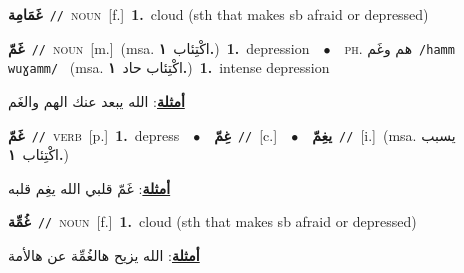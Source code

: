 \documentclass[10pt,a4paper,twoside]{article} %
\begin{document}
\begin{multicols}{2}
{\setlength\topsep{0pt}\textbf{\foreignlanguage{arabic}{غَمَامِة}}\ {\color{gray}\texttt{//}\color{black}}\ \textsc{noun}\ [f.]\ \textbf{1.}~cloud (sth that makes sb afraid or depressed)\ } \vspace{2mm}

{\setlength\topsep{0pt}\textbf{\foreignlanguage{arabic}{غَمّ}}\ {\color{gray}\texttt{//}\color{black}}\ \textsc{noun}\ [m.]\ \color{gray}(msa. \foreignlanguage{arabic}{اكْتِئاب}~\foreignlanguage{arabic}{\textbf{١.}})\color{black}\ \textbf{1.}~depression\ \ $\bullet$\ \ \textsc{ph.} \color{gray} \foreignlanguage{arabic}{هم وغَم}\color{black}\ {\color{gray}\texttt{/{\sffamily hamm wuɣamm}/}\color{black}}\ \color{gray} (msa. \foreignlanguage{arabic}{اكْتِئاب حاد}~\foreignlanguage{arabic}{\textbf{١.}})\color{black}\ \textbf{1.}~intense depression\  \begin{flushright}\color{gray}\foreignlanguage{arabic}{\textbf{\underline{\foreignlanguage{arabic}{أمثلة}}}: الله يبعد عنك الهم والغَم}\end{flushright}\color{black}} \vspace{2mm}

{\setlength\topsep{0pt}\textbf{\foreignlanguage{arabic}{غَمّ}}\ {\color{gray}\texttt{//}\color{black}}\ \textsc{verb}\ [p.]\ \textbf{1.}~depress\ \ $\bullet$\ \ \setlength\topsep{0pt}\textbf{\foreignlanguage{arabic}{غِمّ}}\ {\color{gray}\texttt{//}\color{black}}\ [c.]\ \ $\bullet$\ \ \setlength\topsep{0pt}\textbf{\foreignlanguage{arabic}{يغِمّ}}\ {\color{gray}\texttt{//}\color{black}}\ [i.]\ \color{gray}(msa. \foreignlanguage{arabic}{يسبب اكْتِئاب}~\foreignlanguage{arabic}{\textbf{١.}})\color{black}\  \begin{flushright}\color{gray}\foreignlanguage{arabic}{\textbf{\underline{\foreignlanguage{arabic}{أمثلة}}}: غَمّ قلبي الله يغِم قلبه}\end{flushright}\color{black}} \vspace{2mm}

{\setlength\topsep{0pt}\textbf{\foreignlanguage{arabic}{غُمِّة}}\ {\color{gray}\texttt{//}\color{black}}\ \textsc{noun}\ [f.]\ \textbf{1.}~cloud (sth that makes sb afraid or depressed)\  \begin{flushright}\color{gray}\foreignlanguage{arabic}{\textbf{\underline{\foreignlanguage{arabic}{أمثلة}}}: الله يزيح هالغُمِّة عن هالأمة}\end{flushright}\color{black}} \vspace{2mm}


\end{multicols}
\end{document}
